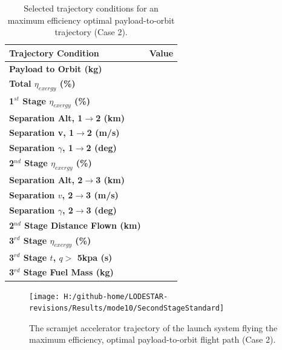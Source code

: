 \begin{table}[ht]%
	\centering
\begin{tabular}{l c } 
	\hline \textbf{Trajectory Condition}
	& Value
	\\
	\hline \textbf{Payload to Orbit (kg)}
	& \textbf{\PayloadToOrbitStandardNoReturn}
	\\
	\textbf{Total $\eta_{exergy}$ (\%)}
	& \textbf{\totalExergyEffStandardNoReturn}
	\\
	\hline 
	\textbf{1$^{st}$ Stage $\eta_{exergy}$ (\%)}
	& \textbf{\firstExergyEffStandardNoReturn}
	\\

	\textbf{Separation Alt, 1$\rightarrow$2 (km)}
	& \firstsecondSeparationAltStandardNoReturn
	\\
	\textbf{Separation v, 1$\rightarrow$2 (m/s)}
	& \firstsecondSeparationvStandardNoReturn
	\\
	\textbf{Separation $\gamma$, 1$\rightarrow$2 (deg)}
	& \firstsecondSeparationgammaStandardNoReturn
	\\
	\hline 
	\textbf{2$^{nd}$ Stage $\eta_{exergy}$ (\%)}
	& \textbf{\secondExergyEffStandardNoReturn}
	\\

	\textbf{Separation Alt, 2$\rightarrow$3 (km)}
	& \secondthirdSeparationAltStandardNoReturn
	\\
	\textbf{Separation $v$, 2$\rightarrow$3 (m/s)}
	& \secondthirdSeparationvStandardNoReturn
	\\
	\textbf{Separation $\gamma$, 2$\rightarrow$3 (deg)}
	& \secondthirdSeparationgammaStandardNoReturn
	\\
	\textbf{2$^{nd}$ Stage Distance Flown (km)}
	& \SecondDistStandardNoReturn
	\\
	\hline 
	\textbf{3$^{rd}$ Stage $\eta_{exergy}$ (\%)}
	& \textbf{\thirddExergyEffStandardNoReturn}
	\\

	\textbf{3$^{rd}$ Stage $t$, $q >$ 5kpa (s)}
	& \thirdqOverFiveStandardNoReturn
	\\
	\textbf{3$^{rd}$ Stage Fuel Mass (kg)}
	& \thirdmFuelStandardNoReturn
	\\
	\hline 
\end{tabular} 
	\caption{Selected trajectory conditions for an maximum efficiency optimal payload-to-orbit trajectory (Case 2).}
	\label{tab:summaryStandardNoReturn}
\end{table}
\begin{figure}[ht!]%
\centering
\texttt{[image: H:/github-home/LODESTAR-revisions/Results/mode10/SecondStageStandard]}
\caption{The scramjet accelerator trajectory of the launch system flying the maximum efficiency, optimal payload-to-orbit flight path (Case 2).}
\label{fig:SecondStageStandardNoReturn}
\end{figure}

